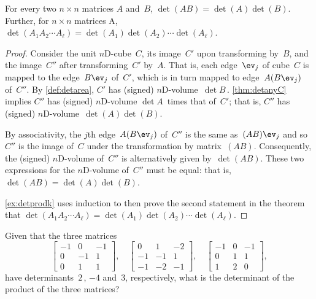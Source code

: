 \begin{theorem} \label{thm:detprod} 
For every two \(n\times n\) matrices \(A\) and~\(B\), \(\det(AB)=\det(A)\det(B)\).
Further, for \(n\times n\) matrices \hlist A\ell, \(\det(A_1A_2\cdots A_\ell)=\det(A_1)\det(A_2)\cdots\det(A_\ell)\).
\end{theorem}


\begin{proof}  
Consider the unit $n$D-cube~\(C\),  its image~\(C'\) upon transforming by~\(B\), and the image~\(C''\) after transforming~\(C'\) by~\(A\). 
That is, each edge~\(\ev_j\) of cube~\(C\) is mapped to the edge~\(B\ev_j\) of~\(C'\), which is in turn mapped to edge~\(A(B\ev_j)\) of~\(C''\). 
By \autoref{def:detarea}, \(C'\) has (signed) $n$D-volume~\(\det B\)\,.
\autoref{thm:detanyC} implies \(C''\) has (signed) $n$D-volume \(\det A\)~times that of~\(C'\); that is, \(C''\) has (signed) $n$D-volume~\(\det(A)\det(B)\).  

By associativity, the \(j\)th edge~\(A(B\ev_j)\) of~\(C''\) is the same as~\((AB)\ev_j\) and so \(C''\) is the image of~\(C\) under the transformation by matrix~\((AB)\).
Consequently, the (signed) $n$D-volume of~\(C''\) is alternatively given by~\(\det(AB)\).
These two expressions for the $n$D-volume of~\(C''\) must be equal: that is, \(\det(AB)=\det(A)\det(B)\).

\autoref{ex:detprodk} uses induction to then prove the second statement in the theorem that \(\det(A_1A_2\cdots A_\ell)=\det(A_1)\det(A_2)\cdots\det(A_\ell)\).
\end{proof}



\begin{activity}
Given that the three matrices
\begin{equation*}
\begin{bmatrix} -1&0&-1
\\0&-1&1
\\0&1&1 \end{bmatrix},\quad
\begin{bmatrix} 0&1&-2
\\-1&-1&1
\\-1&-2&-1 \end{bmatrix},\quad
\begin{bmatrix} -1&0&-1
\\0&1&1
\\1&2&0 \end{bmatrix},
\end{equation*}
have determinants~\(2\)\,, \(-4\) and~\(3\), respectively, what is the determinant of the product of the three matrices?
\end{activity}





